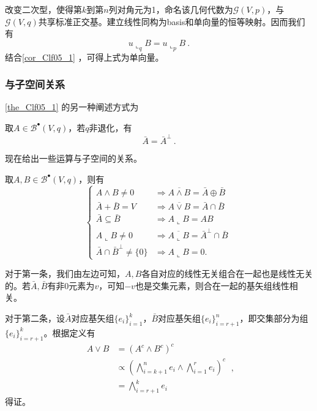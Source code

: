 改变二次型，使得第$k$到第$n$列对角元为1，命名该几何代数为$\mathcal G(V,p)$，与$\mathcal G(V,q)$共享标准正交基。建立线性同构为basis和单向量的恒等映射。因而我们有
\begin{equation}\label{eq_Clf05_1}
u\llcorner_q B=u\llcorner _p B~.
\end{equation}
结合\autoref{cor_Clf05_1} ，可得上式为单向量。


\subsubsection{与子空间关系}
\autoref{the_Clf05_1} 的另一种阐述方式为
\begin{theorem}{}
取$A\in \mathcal B^{\bullet}(V,q)$，若$q$非退化，有
\begin{equation}
\bar A=\bar A^{\perp}~.
\end{equation}
\end{theorem}
现在给出一些运算与子空间的关系。
\begin{theorem}{}
取$A,B\in \mathcal B^{\bullet}(V,q)$，则有
\begin{equation}
\left\{\begin{aligned}
A \wedge B \neq 0 & \Longrightarrow \overline{A \wedge B}=\bar{A} \oplus \bar{B} \\
\bar{A}+\bar{B}=V & \Longrightarrow \overline{A \vee B}=\bar{A} \cap \bar{B} \\
\bar{A} \subseteq \bar{B} & \Longrightarrow A\llcorner B=A B \\
A\llcorner B \neq 0 & \Longrightarrow \overline{A\llcorner B}=\bar{A}^{\perp} \cap \bar{B} \\
\bar{A} \cap \bar{B}^{\perp} \neq\{0\} & \Longrightarrow A\llcorner B=0 .
\end{aligned}\right.~
\end{equation}
\end{theorem}
对于第一条，我们由左边可知，$A,B$各自对应的线性无关组合在一起也是线性无关的。若$\bar A,\bar B$有非0元素为$v$，可知$-v$也是交集元素，则合在一起的基矢组线性相关。

对于第二条，设$\bar A$对应基矢组$\{e_i\}^k_{i=1}$，$\bar B$对应基矢组$\{e_i\}^n_{i=r+1}$，即交集部分为组$\{e_i\}^k_{i=r+1}$。根据定义有
\begin{equation}
\begin{aligned}
A \vee B &=(A^c\wedge B^c)^c\\
&\propto\left(\bigwedge\limits^n_{i=k+1}e_i\wedge \bigwedge\limits^r_{i=1}e_i\right)^c\\
&=\bigwedge\limits^k_{i=r+1}e_i
\end{aligned}~,
\end{equation}
得证。